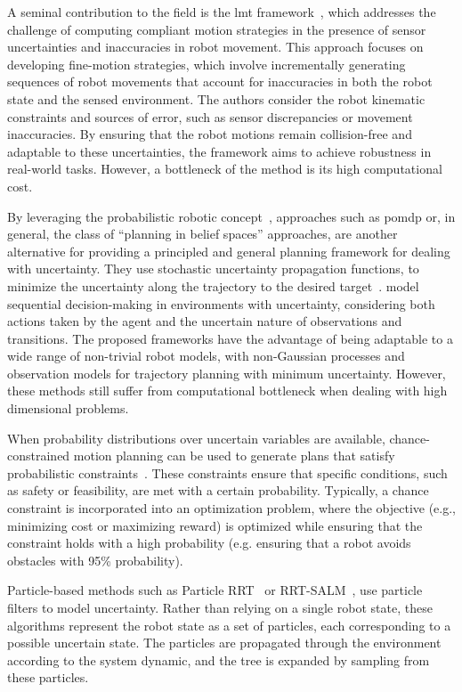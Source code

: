 A seminal contribution to the field is the \gls{lmt} framework~\cite{cLMT}, which addresses the challenge of computing compliant motion strategies in the presence of sensor uncertainties and inaccuracies in robot movement. 
This approach focuses on developing fine-motion strategies, which involve incrementally generating sequences of robot movements that account for inaccuracies in both the robot state and the sensed environment. 
The authors consider the robot kinematic constraints and sources of error, such as sensor discrepancies or movement inaccuracies.
By ensuring that the robot motions remain collision-free and adaptable to these uncertainties, the framework aims to achieve robustness in real-world tasks.
However, a bottleneck of the method is its high computational cost.

By leveraging the probabilistic robotic concept~\cite{cProbaRobotic}, approaches such as \gls{pomdp} or, in general, the class of “planning in belief spaces” approaches, are another alternative for providing a principled and general planning framework for dealing with uncertainty.
They use stochastic uncertainty propagation functions, to minimize the uncertainty along the trajectory to the desired target~\cite{cUncertaintyPOMDP,cNavigationPOMPDP}. 
 model sequential decision-making in environments with uncertainty, considering both actions taken by the agent and the uncertain nature of observations and transitions.
The proposed frameworks have the advantage of being adaptable to a wide range of non-trivial robot models, with non-Gaussian processes and observation models for trajectory planning with minimum uncertainty.
However, these methods still suffer from computational bottleneck when dealing with high dimensional problems.

When probability distributions over uncertain variables are available, chance-constrained motion planning can be used to generate plans that satisfy probabilistic constraints~\cite{cChance3,cChance1,cChance2,}. 
These constraints ensure that specific conditions, such as safety or feasibility, are met with a certain probability. 
Typically, a chance constraint is incorporated into an optimization problem, where the objective (e.g., minimizing cost or maximizing reward) is optimized while ensuring that the constraint holds with a high probability (e.g. ensuring that a robot avoids obstacles with 95\% probability).

Particle-based methods such as Particle RRT~\cite{cParticleRRT} or RRT-SALM~\cite{cSlamRRT}, use particle filters to model uncertainty. 
Rather than relying on a single robot state, these algorithms represent the robot state as a set of particles, each corresponding to a possible uncertain state. 
The particles are propagated through the environment according to the system dynamic, and the tree is expanded by sampling from these particles.

